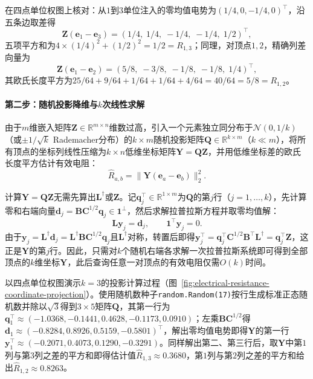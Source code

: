 在四点单位权图上核对：从$1$到$3$单位注入的零均值电势为$(1/4, 0, -1/4, 0)^\top$，沿五条边取差得
\[
  \bm Z(\bm e_1 - \bm e_3) = (1/4, \; 1/4, \; -1/4, \; -1/4, \; 1/2)^\top,
\]
五项平方和为$4\times(1/4)^2+(1/2)^2=1/2=R_{1,3}$；同理，对顶点$1,2$，精确列差向量为
\[
  \bm Z(\bm e_1 - \bm e_2) = (5/8, \; -3/8, \; -1/8, \; -1/8, \; 1/4)^\top,
\]
其欧氏长度平方为$25/64+9/64+1/64+1/64+4/64=40/64=5/8=R_{1,2}$。

\paragraph{第二步：随机投影降维与$k$次线性求解}
由于$m$维嵌入矩阵$\bm Z\in\mathbb R^{m\times n}$维数过高，引入一个元素独立同分布于$\mathcal N(0,1/k)$（或$\pm 1/\sqrt{k}$ Rademacher分布）的$k\times m$随机投影矩阵$\bm Q \in \mathbb R^{k \times m}$（$k\ll m$），将所有顶点的坐标列线性压缩为$k\times n$低维坐标矩阵$\bm Y = \bm Q\bm Z$，并用低维坐标差的欧氏长度平方估计有效电阻：
\[
  \widehat R_{a,b} = \lVert \bm Y(\bm e_a - \bm e_b) \rVert_2^2.
\]

计算$\bm Y=\bm Q\bm Z$无需先算出$\bm L^\dagger$或$\bm Z$。记$\bm q_j^\top\in\mathbb R^{1\times m}$为$\bm Q$的第$j$行（$j=1,\ldots,k$），先计算零和右端向量$\bm d_j = \bm B\bm C^{1/2} \bm q_j\in\bm 1^\perp$，然后求解拉普拉斯方程并取零均值解：
\begin{equation}
  \bm L\bm y_j = \bm d_j, \qquad \bm 1^\top \bm y_j = 0.
  \label{eq:electrical-projection-systems}
\end{equation}
由于$\bm y_j = \bm L^\dagger \bm d_j=\bm L^\dagger\bm B\bm C^{1/2}\bm q_j$且$\bm L^\dagger$对称，转置后即得$\bm y_j^\top = \bm q_j^\top \bm C^{1/2} \bm B^\top \bm L^\dagger = \bm q_j^\top \bm Z$，这正是$\bm Y$的第$j$行。因此，只需对$k$个随机右端各求解一次拉普拉斯系统即可得到全部顶点的$k$维坐标$\bm Y$，此后查询任意一对顶点的有效电阻仅需$O(k)$时间。

以四点单位权图演示$k = 3$的投影计算过程（图~\ref{fig:electrical-resistance-coordinate-projection}）。使用随机数种子\texttt{random.Random(17)}按行生成标准正态随机数并除以$\sqrt{3}$得到$3\times 5$矩阵$\bm Q$，其第一行为$\bm q_1^\top\approx(-1.0368, -0.1441, 0.4628, -0.1173, 0.0910)$；左乘$\bm B\bm C^{1/2}$得$\bm d_1 \approx (-0.8284, 0.8926, 0.5159, -0.5801)^\top$，解出零均值电势即得$\bm Y$的第一行$\bm y_1^\top \approx (-0.2071, 0.4073, 0.1290, -0.3291)$。同样解出第二、第三行后，取$\bm Y$中第$1$列与第$3$列之差的平方和即得估计值$\widehat R_{1,3}\approx 0.3680$，第$1$列与第$2$列之差的平方和给出$\widehat R_{1,2}\approx 0.8263$。

